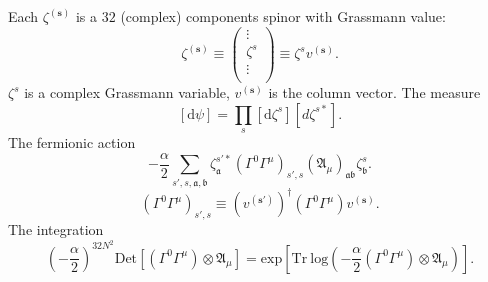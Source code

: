 Each $\zeta^{(\mathbf{s})}$ is a $32$ (complex) components spinor
with Grassmann value:
\[
	\zeta^{(\mathbf{s})} \equiv
	\begin{pmatrix}
		\vdots\\
		\zeta^s \\
		\vdots\\
	\end{pmatrix}
	\equiv \zeta^s v^{(\mathbf{s})}
.\] 
$\zeta^s$ is a complex Grassmann variable,
$v^{(\mathbf{s})}$ is the column vector.
The measure
\[
	[\mathrm{d}\psi] = \prod_{s} [\mathrm{d} \zeta^s]
	[d \zeta^{s*}]
.\] 
The fermionic action
\[
	- \frac{\alpha}{2} \sum_{s',s,\mathfrak{a},\mathfrak{b}}
	\zeta^{s'*}_{\mathfrak{a}} 
	(\Gamma^0 \Gamma^\mu )_{s',s}
	(\mathfrak{A}_{\mu})_{\mathfrak{a}\mathfrak{b}} 
	\zeta^{s}_{\mathfrak{b}}
.\] 
\[
	(\Gamma^0 \Gamma^\mu )_{s',s} \equiv (v^{(\mathbf{s}')})^\dagger
	(\Gamma^0 \Gamma^\mu) v^{(\mathbf{s})}
.\] 
The integration
\[
	\left( - \frac{\alpha}{2} \right)^{32N^2}
	\mathrm{Det} \left[ (\Gamma^0 \Gamma^\mu) \otimes \mathfrak{A}_\mu \right]
	= \mathrm{exp} \left[ \mathrm{Tr} ~ \mathrm{log} 
	\left( - \frac{\alpha}{2} (\Gamma^0 \Gamma^\mu) \otimes \mathfrak{A}_\mu \right) \right]
.\] 
